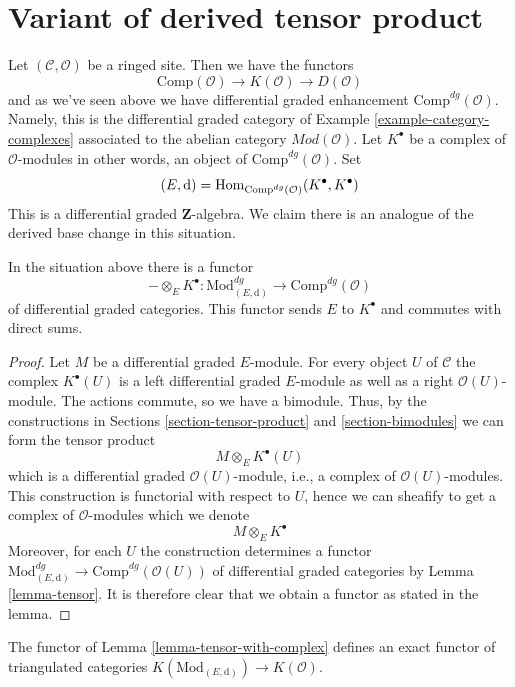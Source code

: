 \section{Variant of derived tensor product}
\label{section-variant-base-change}

\noindent
Let $(\mathcal{C}, \mathcal{O})$ be a ringed site. Then we have the functors
$$
\text{Comp}(\mathcal{O}) \to K(\mathcal{O}) \to D(\mathcal{O})
$$
and as we've seen above we have differential graded enhancement
$\text{Comp}^{dg}(\mathcal{O})$. Namely, this is the differential
graded category of Example \ref{example-category-complexes} associated
to the abelian category $\textit{Mod}(\mathcal{O})$.
Let $K^\bullet$ be a complex of $\mathcal{O}$-modules in other
words, an object of $\text{Comp}^{dg}(\mathcal{O})$. Set
$$
(E, \text{d}) =
\mathop{\mathrm{Hom}}\nolimits_{\text{Comp}^{dg}(\mathcal{O})}(K^\bullet, K^\bullet)
$$
This is a differential graded $\mathbf{Z}$-algebra. We claim there is
an analogue of the derived base change in this situation.

\begin{lemma}
\label{lemma-tensor-with-complex}
In the situation above there is a functor
$$
- \otimes_E K^\bullet :
\text{Mod}^{dg}_{(E, \text{d})}
\longrightarrow
\text{Comp}^{dg}(\mathcal{O})
$$
of differential graded categories. This functor sends $E$ to $K^\bullet$
and commutes with direct sums.
\end{lemma}

\begin{proof}
Let $M$ be a differential graded $E$-module. For every object $U$ of
$\mathcal{C}$ the complex $K^\bullet(U)$ is a left differential
graded $E$-module as well as a right $\mathcal{O}(U)$-module.
The actions commute, so we have a bimodule.
Thus, by the constructions in
Sections \ref{section-tensor-product} and \ref{section-bimodules}
we can form the tensor product
$$
M \otimes_E K^\bullet(U)
$$
which is a differential graded $\mathcal{O}(U)$-module, i.e., a complex
of $\mathcal{O}(U)$-modules. This construction is functorial with respect
to $U$, hence we can sheafify to get a complex of $\mathcal{O}$-modules
which we denote
$$
M \otimes_E K^\bullet
$$
Moreover, for each $U$ the construction determines a functor
$\text{Mod}^{dg}_{(E, \text{d})} \to \text{Comp}^{dg}(\mathcal{O}(U))$
of differential graded categories by Lemma \ref{lemma-tensor}.
It is therefore clear that we obtain a functor as stated in the lemma.
\end{proof}

\begin{lemma}
\label{lemma-tensor-with-complex-homotopy}
The functor of Lemma \ref{lemma-tensor-with-complex} defines an exact functor
of triangulated categories
$K(\text{Mod}_{(E, \text{d})}) \to K(\mathcal{O})$.
\end{lemma}

